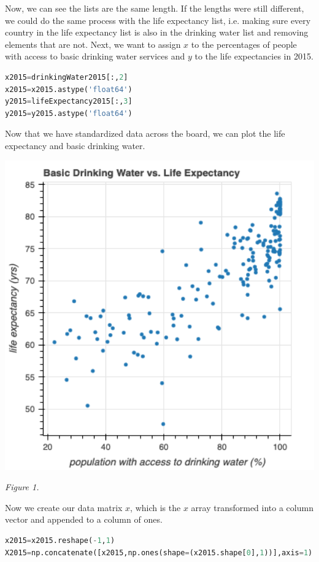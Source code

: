 \documentclass[12pt]{article}
\begin{document}
\noindent
Now, we can see the lists are the same length. If the lengths were still different, we could do the same process with the life expectancy list, i.e. making sure every country in the life expectancy list is also in the drinking water list and removing elements that are not. Next, we want to assign $x$ to the percentages of people with access to basic drinking water services and $y$ to the life expectancies in 2015.
\begin{lstlisting}[language=Python]
x2015=drinkingWater2015[:,2]
x2015=x2015.astype('float64')
y2015=lifeExpectancy2015[:,3]
y2015=y2015.astype('float64')
\end{lstlisting}

\noindent
Now that we have standardized data across the board, we can plot the life expectancy and basic drinking water.

\begin{center}
\includegraphics[width=6in]{Figures/figure1.png}\\
\end{center}

\begin{center}
    \textit{Figure 1.}
\end{center}

\noindent
Now we create our data matrix $x$, which is the $x$ array transformed into a column vector and appended to a column of ones.
\begin{lstlisting}[language=Python]
x2015=x2015.reshape(-1,1)
X2015=np.concatenate([x2015,np.ones(shape=(x2015.shape[0],1))],axis=1)
\end{lstlisting}
\end{document}
